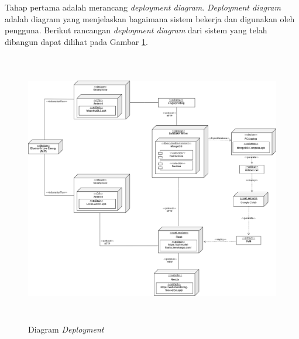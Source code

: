 Tahap pertama adalah merancang \textit{deployment diagram}. \textit{Deployment diagram} adalah diagram yang menjelaskan bagaimana sistem bekerja dan digunakan oleh pengguna. Berikut rancangan \textit{deployment diagram} dari sistem yang telah dibangun dapat dilihat pada Gambar \ref{deployment-diagram}.

\vspace{-0.2cm}
\begin{landscape}
	\begin{figure}[H]
		\center
		\includegraphics [width = 22.5cm, height=12cm]{gambar/diagramdeployment.png}
		\caption{Diagram \textit{Deployment}}
		\label{deployment-diagram}
	\end{figure}
\end{landscape}

